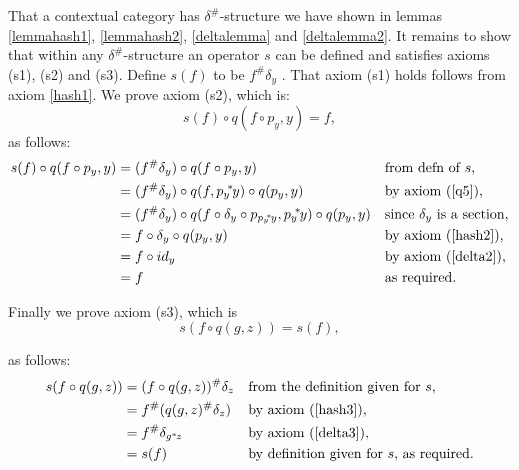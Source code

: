 \documentclass[10pt,a4paper]{scrartcl}
\newcommand{\ssub}{\kern-2pt^*\kern-1pt}
\renewcommand{\sub}{^*\kern-1pt}
\newcommand{\hash}{^\#}
\newcommand{\byaxiom}[1]{by axiom (\ref{#1})}
\begin{document}
That a contextual category has $\delta\hash$-structure we have shown in lemmas \ref{lemmahash1}, \ref{lemmahash2},
\ref{deltalemma} and \ref{deltalemma2}.
It remains to show that within any $\delta\hash$-structure an operator $s$ can be defined and satisfies axioms (s1), (s2) and (s3).
\noindent
Define $s(f)$ to be $f \hash\delta_y$ . 
\noindent
That axiom (s1) holds follows from axiom \ref{hash1}.
\noindent
We prove axiom (s2), which is:
\begin{equation*}
s(f) \circ q( f \circ p_y ,y)=f,
\end{equation*}
\noindent
 as follows:
\begin{align*}
s(f) \circ q( f \circ p_y ,y)
 &= (f \hash \delta_y) \circ q(f \circ p_y, y)                                                  && \mbox{from defn of $s$,} \\
 &= (f \hash \delta_y) \circ q(f,{p_y} \ssub y) \circ q(p_y,y)                                  && \mbox{\byaxiom{q5},} \\
 &= (f \hash \delta_y) \circ q(f \circ \delta_y \circ p_{{p_y} \ssub y},{p_y} \ssub y) \circ q(p_y,y) 
                                                                                                && \mbox{since $\delta_y$ is a section,} \\
 &= f \circ \delta_y \circ q(p_y,y)                                                             && \mbox{\byaxiom{hash2},} \\
 &= f \circ id_y                                                                                && \mbox{\byaxiom{delta2},} \\
 &= f                                                                                           && \mbox{as required.}
\end{align*}

\noindent
Finally we prove axiom (s3), which is
\begin{equation*}
s(f \circ q(g,z))=s(f),
\end{equation*}

\noindent
 as follows:
\begin{align*}
s(f \circ q(g,z)) &= (f \circ q(g,z)) \hash \delta_z      && \mbox{from the definition given for $s$,} \\
                  &= f \hash (  q(g,z) \hash \delta_z)    &&\mbox{\byaxiom{hash3},} \\
                  &= f \hash \delta_{g \sub z}            && \mbox{\byaxiom{delta3},} \\
	              &= s(f)                                 && \mbox{by definition given for $s$, as required.}
\end{align*}


 
\end{document}
